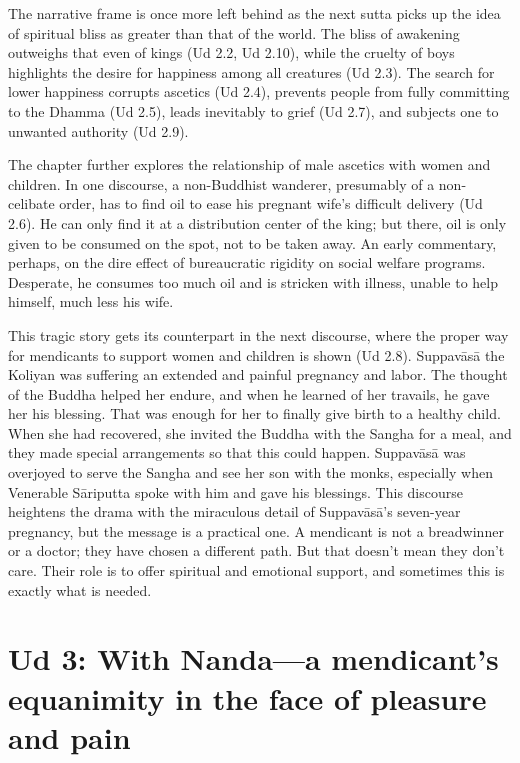 \documentclass[12pt,openany]{book}%
\begin{document}
The narrative frame is once more left behind as the next sutta picks up the idea of spiritual bliss as greater than that of the world. The bliss of awakening outweighs that even of kings (Ud 2.2, Ud 2.10), while the cruelty of boys highlights the desire for happiness among all creatures (Ud 2.3). The search for lower happiness corrupts ascetics (Ud 2.4), prevents people from fully committing to the Dhamma (Ud 2.5), leads inevitably to grief (Ud 2.7), and subjects one to unwanted authority (Ud 2.9).

The chapter further explores the relationship of male ascetics with women and children. In one discourse, a non-Buddhist wanderer, presumably of a non-celibate order, has to find oil to ease his pregnant wife’s difficult delivery (Ud 2.6). He can only find it at a distribution center of the king; but there, oil is only given to be consumed on the spot, not to be taken away. An early commentary, perhaps, on the dire effect of bureaucratic rigidity on social welfare programs. Desperate, he consumes too much oil and is stricken with illness, unable to help himself, much less his wife. 

This tragic story gets its counterpart in the next discourse, where the proper way for mendicants to support women and children is shown (Ud 2.8). \textsanskrit{Suppavāsā} the Koliyan was suffering an extended and painful pregnancy and labor. The thought of the Buddha helped her endure, and when he learned of her travails, he gave her his blessing. That was enough for her to finally give birth to a healthy child. When she had recovered, she invited the Buddha with the Sangha for a meal, and they made special arrangements so that this could happen. \textsanskrit{Suppavāsā} was overjoyed to serve the Sangha and see her son with the monks, especially when Venerable \textsanskrit{Sāriputta} spoke with him and gave his blessings. This discourse heightens the drama with the miraculous detail of \textsanskrit{Suppavāsā}’s seven-year pregnancy, but the message is a practical one. A mendicant is not a breadwinner or a doctor; they have chosen a different path. But that doesn’t mean they don’t care. Their role is to offer spiritual and emotional support, and sometimes this is exactly what is needed.

\section*{Ud 3: With Nanda—a mendicant’s equanimity in the face of pleasure and pain}
\end{document}
